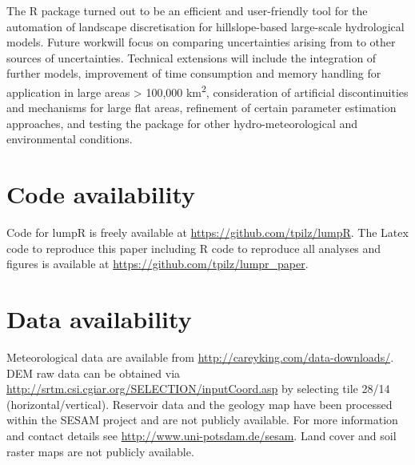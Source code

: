 The R package turned out to be an efficient and user-friendly tool for the automation of landscape discretisation for hillslope-based large-scale hydrological models.
Future work\DIFaddbegin {}\DIFaddend will focus on comparing uncertainties arising from \DIFdelbegin {}\DIFdelend \DIFaddbegin {}\DIFaddend to other sources of uncertainties.
\DIFaddbegin {}\DIFaddend Technical extensions will include the integration of further models, improvement of time consumption and memory handling for application in large areas > 100,000 \unit{km^2}, consideration of artificial discontinuities and mechanisms for large flat areas, refinement of certain parameter estimation approaches, and testing the package for other hydro-meteorological and environmental conditions.




\section{Code availability}
\label{sec:code_availability}
Code for lumpR is freely available at \url{https://github.com/tpilz/lumpR}.
The Latex code to reproduce this paper including R code to reproduce all analyses and figures is available at \url{https://github.com/tpilz/lumpr_paper}.




\section{Data availability}
Meteorological data are available from \url{http://careyking.com/data-downloads/}.
DEM raw data can be obtained via \url{http://srtm.csi.cgiar.org/SELECTION/inputCoord.asp} by selecting tile 28/14 (horizontal/vertical).
Reservoir data and the geology map have been processed within the SESAM project and are not publicly available.
For more information and contact details see \url{http://www.uni-potsdam.de/sesam}.
Land cover and soil raster maps are not publicly available.


\newpage
\appendix
